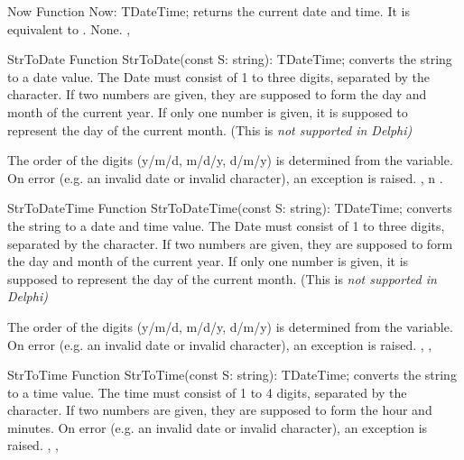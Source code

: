 
 
\begin{function}{Now}
\Declaration
Function Now: TDateTime;
\Description
{} returns the current date and time. It is equivalent to 
.
\Errors
None.
\SeeAlso
{}, 
\end{function}


 
\begin{function}{StrToDate}
\Declaration
Function StrToDate(const S: string): TDateTime;
\Description
{} converts the string  to a  date 
value. The Date must consist of 1 to three digits, separated by the 
 character. If two numbers are given, they
are supposed to form the day and month of the current year. If only 
one number is given, it is supposed to represent the day of the 
current month. (This is \em{not} supported in Delphi)

The order of the digits (y/m/d, m/d/y, d/m/y) is determined from the 
 variable.
\Errors
On error (e.g. an invalid date or invalid character), 
an  exception is raised.
\SeeAlso
{}, n .
\end{function}



\begin{function}{StrToDateTime}
\Declaration
Function StrToDateTime(const S: string): TDateTime;
\Description
{} converts the string  to a  date 
and time value. The Date must consist of 1 to three digits, separated by the 
 character. If two numbers are given, they
are supposed to form the day and month of the current year. If only 
one number is given, it is supposed to represent the day of the 
current month. (This is \em{not} supported in Delphi)

The order of the digits (y/m/d, m/d/y, d/m/y) is determined from the 
 variable.
\Errors
On error (e.g. an invalid date or invalid character), 
an  exception is raised.
\SeeAlso
{}, , 
\end{function}


 
\begin{function}{StrToTime}
\Declaration
Function StrToTime(const S: string): TDateTime;
\Description
{} converts the string  to a  time 
value. The time must consist of 1 to 4 digits, separated by the 
 character. If two numbers are given, they
are supposed to form the hour and minutes. 
\Errors
On error (e.g. an invalid date or invalid character), 
an  exception is raised.
\SeeAlso
{}, , 
\end{function}

